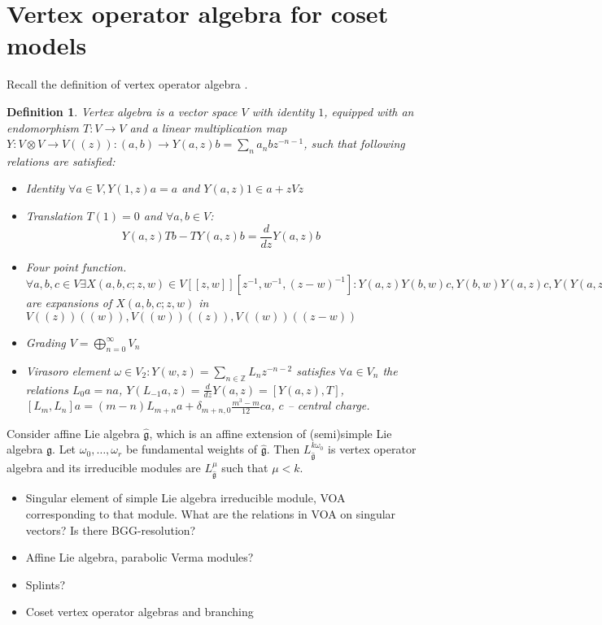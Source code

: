 \documentclass[12pt]{article}
\newtheorem{Def}{Definition}[section]
\newcommand{\gf}{\mathfrak{g}}
\newcommand{\gfh}{\hat{\mathfrak{g}}}
\begin{document}
\section{Vertex operator algebra for coset models}
\label{sec:vert-oper-algebra}

Recall the definition of vertex operator algebra \cite{borcherds1986vertex,kac1998vertex,frenkel2001vertex,frenkel1988vertex}.
\begin{Def}
  Vertex algebra is a  vector space $V$ with identity $1$, equipped with an endomorphism
  $T:V\to V$ and a linear multiplication map $Y:V\otimes V\to V((z)):
  (a,b)\to Y(a,z)b=\sum_n a_n b z^{-n-1}$,
  such that following relations are satisfied:
  \begin{itemize}
  \item {\it Identity} $\forall a\in V, Y(1,z) a =a$ and $Y(a,z) 1 \in a+z V z$
  \item {\it Translation} $T(1)=0$ and $\forall a,b\in V$:
    $$Y(a,z)T b - T Y(a,z) b =
    \frac{d}{dz} Y(a,z) b$$
  \item {\it Four point function}. $\forall a,b,c\in V \exists
    X(a,b,c;z,w)\in V[[z,w]][z^{-1},w^{-1},(z-w)^{-1}]: Y(a,z)Y(b,w)c,
    Y(b,w)Y(a,z)c, Y(Y(a,z-w)b,w)c$ are expansions of $X(a,b,c;z,w)$
    in $V((z))((w)), V((w))((z)), V((w))((z-w))$
  \item {\it Grading} $V=\bigoplus_{n=0}^{\infty} V_n$
  \item {\it Virasoro element} $\omega\in V_2: Y(w,z)=\sum_{n\in
      \mathbb{Z}} L_n z^{-n-2}$ satisfies $\forall a\in V_n$ the
      relations $L_0 a =n a$,
      $Y(L_{-1}a,z)=\frac{d}{dz}Y(a,z)=[Y(a,z),T]$,
      $[L_m,L_n]a=(m-n)L_{m+n} a + \delta_{m+n,0} \frac{m^3 -
        m}{12}ca$, $c$ -- central charge.
  \end{itemize}

\end{Def}

Consider affine Lie algebra $\gfh$, which is an affine extension of (semi)simple Lie algebra $\gf$.
Let $\omega_{0},\dots,\omega_{r}$ be fundamental weights of $\gfh$. Then $L^{k\omega_{0}}_{\gfh}$ is vertex operator algebra and its irreducible modules are $L^{\mu}_{\gfh}$ such that $\mu<k$.




\begin{itemize}
\item Singular element of simple Lie algebra irreducible module, VOA corresponding to that module.
  What are the relations in VOA on singular vectors? Is there BGG-resolution?
\item Affine Lie algebra, parabolic Verma modules?
\item Splints?
\item Coset vertex operator algebras and branching
\end{itemize}


{}

\end{document}
